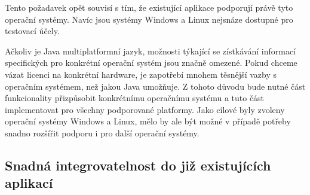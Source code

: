 Tento požadavek opět souvisí s tím, že existující aplikace podporují právě tyto
operační systémy. Navíc jsou systémy Windows a Linux nejsnáze dostupné pro
testovací účely. 

Ačkoliv je Java multiplatformní jazyk, možnosti týkající se zístkávání informací
specifických pro konkrétní operační systém jsou značně omezené. Pokud chceme
vázat licenci na konkrétní hardware, je zapotřebí mnohem těsnější vazby s
operačním systémem, než jakou Java umožňuje. Z tohoto důvodu bude nutné část
funkcionality přizpůsobit konkrétnímu operačnímu systému a tuto část
implementovat pro všechny podporované platformy. Jako cílové byly zvoleny
operační systémy Windows a Linux, mělo by ale být možné v případě potřeby snadno
rozšířit podporu i pro další operační systémy.


\subsection{Snadná integrovatelnost do již existujících aplikací}
 
 
  
